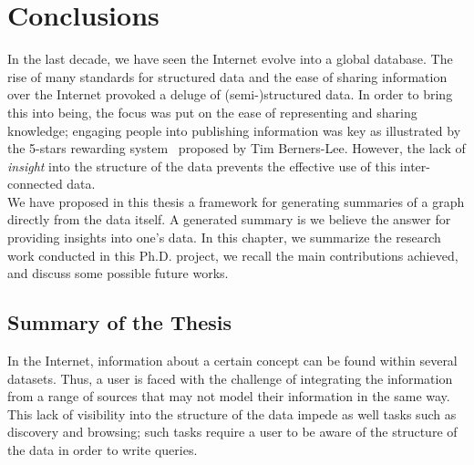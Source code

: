 \chapter{Conclusions}

In the last decade, we have seen the Internet evolve into a global database. The rise of many standards for structured data and the ease of sharing information over the Internet provoked a deluge of (semi-)structured data. In order to bring this into being, the focus was put on the ease of representing and sharing knowledge; engaging people into publishing information was key as illustrated by the 5-stars rewarding system~\cite{5stars} proposed by Tim Berners-Lee. However, the lack of \emph{insight} into the structure of the data prevents the effective use of this inter-connected data.\\

We have proposed in this thesis a framework for generating summaries of a graph directly from the data itself. A generated summary is we believe the answer for providing insights into one's data. In this chapter, we summarize the research work conducted in this Ph.D. project, we recall the main contributions achieved, and discuss some possible future works.

\section{Summary of the Thesis}


In the Internet, information about a certain concept can be found within several datasets. Thus, a user is faced with the challenge of integrating the information from a range of sources that may not model their information in the same way. This lack of visibility into the structure of the data impede as well tasks such as discovery and browsing; such tasks require a user to be aware of the structure of the data in order to write queries.

